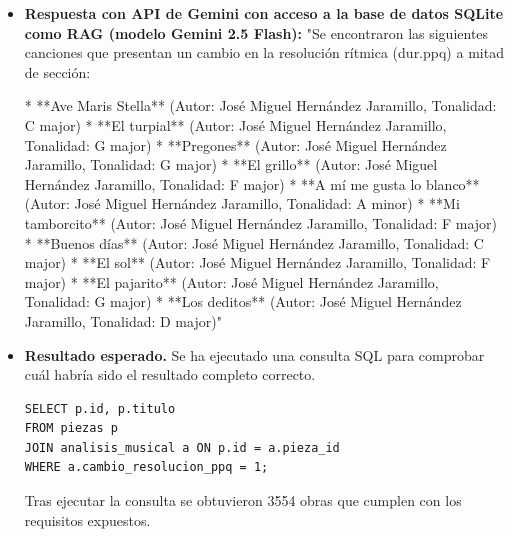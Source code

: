 \begin{itemize}
* En la primera medida, el `<measure>` con número 1 tiene `divisions=""256""`. Luego, en la segunda medida, el `<measure>` con número 2 tiene `divisions=""128""`.
* En la segunda medida, el `<direction>` con identificador ""104"" tiene un valor de `dur.ppq` que podría indicar un cambio en la resolución rítmica.
* En algún lugar del documento, podrías encontrar un elemento `<attributes>` que contenga información sobre el tempo o los divisores para la duración, lo que podría indicar un cambio en la resolución rítmica.

Recuerda que la búsqueda de cambios en la resolución rítmica puede requerir una revisión detallada del documento y la comprensión de la estructura y la notación musical utilizadas."
\item \textbf{Respuesta con API de Gemini con acceso a la base de datos SQLite como RAG (modelo Gemini 2.5 Flash):} "Se encontraron las siguientes canciones que presentan un cambio en la resolución rítmica (dur.ppq) a mitad de sección:

*   **Ave Maris Stella** (Autor: José Miguel Hernández Jaramillo, Tonalidad: C major)
*   **El turpial** (Autor: José Miguel Hernández Jaramillo, Tonalidad: G major)
*   **Pregones** (Autor: José Miguel Hernández Jaramillo, Tonalidad: G major)
*   **El grillo** (Autor: José Miguel Hernández Jaramillo, Tonalidad: F major)
*   **A mí me gusta lo blanco** (Autor: José Miguel Hernández Jaramillo, Tonalidad: A minor)
*   **Mi tamborcito** (Autor: José Miguel Hernández Jaramillo, Tonalidad: F major)
*   **Buenos días** (Autor: José Miguel Hernández Jaramillo, Tonalidad: C major)
*   **El sol** (Autor: José Miguel Hernández Jaramillo, Tonalidad: F major)
*   **El pajarito** (Autor: José Miguel Hernández Jaramillo, Tonalidad: G major)
*   **Los deditos** (Autor: José Miguel Hernández Jaramillo, Tonalidad: D major)"
\item \textbf{Resultado esperado.} Se ha ejecutado una consulta SQL para comprobar cuál habría sido el resultado completo correcto.
    \begin{verbatim}
SELECT p.id, p.titulo
FROM piezas p
JOIN analisis_musical a ON p.id = a.pieza_id
WHERE a.cambio_resolucion_ppq = 1;
    \end{verbatim} 
    Tras ejecutar la consulta se obtuvieron 3554 obras que cumplen con los requisitos expuestos.

\end{itemize}

